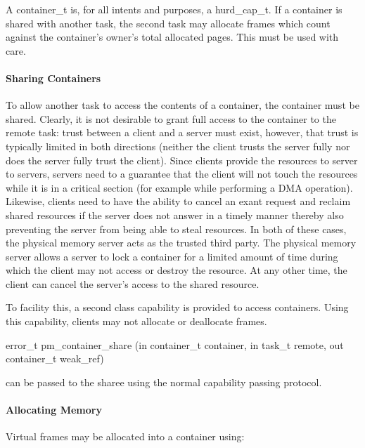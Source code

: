 A container\_t is, for all intents and purposes, a hurd\_cap\_t.  If a
container is shared with another task, the second task may allocate
frames which count against the container's owner's total allocated
pages.  This must be used with care.

\paragraph{Sharing Containers}

To allow another task to access the contents of a container, the
container must be shared.  Clearly, it is not desirable to grant full
access to the container to the remote task: trust between a client and
a server must exist, however, that trust is typically limited in both
directions (neither the client trusts the server fully nor does the
server fully trust the client).  Since clients provide the resources
to server to servers, servers need to a guarantee that the client will
not touch the resources while it is in a critical section (for example
while performing a DMA operation).  Likewise, clients need to have the
ability to cancel an exant request and reclaim shared resources if the
server does not answer in a timely manner thereby also preventing the
server from being able to steal resources.  In both of these cases,
the physical memory server acts as the trusted third party.  The
physical memory server allows a server to lock a container for a
limited amount of time during which the client may not access or
destroy the resource.  At any other time, the client can cancel the
server's access to the shared resource.

To facility this, a second class capability is provided to access
containers.  Using this capability, clients may not allocate or
deallocate frames.

\begin{code}
error\_t pm\_container\_share (in container\_t container, in task\_t
remote, out container\_t weak_ref)
\end{code}

\noindent
{} can be passed to the sharee using the normal
capability passing protocol.

\paragraph{Allocating Memory}

Virtual frames may be allocated into a container using:

